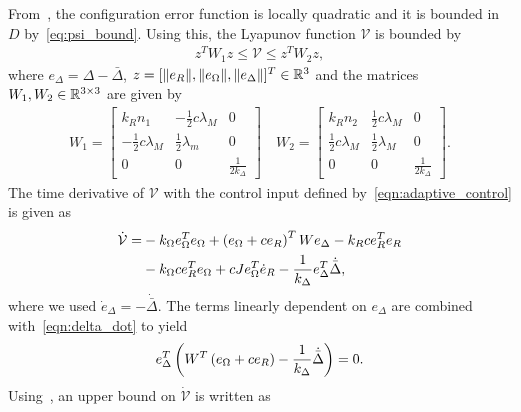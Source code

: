 From~, the configuration error function is locally quadratic and it is bounded in \( D \) by~\cref{eq:psi_bound}.
Using this, the Lyapunov function \( \mathcal{V} \) is bounded by
\begin{align*} %
	z^T W_1 z \leq \mathcal{V} \leq z^T W_2 z ,
\end{align*}
where \( e_\Delta = \Delta - \bar{\Delta} \), \( z = [\|e_R\|,\|e_\Omega\|,\|e_\Delta\|]^T\in\mathbb{R}^3 \) and the matrices \(W_1,W_2 \in \mathbb{R}^{3 \times 3}\) are given by
\begin{align*}
	W_1  = \begin{bmatrix}
		k_R n_1 & -\frac{1}{2} c \lambda_M & 0 \\
		-\frac{1}{2} c \lambda_M & \frac{1}{2} \lambda_m & 0 \\
		0 & 0 & \frac{1}{2 k_\Delta}
	\end{bmatrix}\quad
	W_2  = \begin{bmatrix}
		k_R n_2 & \frac{1}{2} c \lambda_M & 0 \\
		\frac{1}{2} c \lambda_M & \frac{1}{2} \lambda_M & 0 \\
		0 & 0 & \frac{1}{2 k_\Delta}
	\end{bmatrix}.
\end{align*}
The time derivative of \( \mathcal{V}\) with the control input defined by~\cref{eqn:adaptive_control} is given as
\begin{align*}
	\dot{\mathcal{V}} =& - k_\Omega e_\Omega^T e_\Omega + \left( e_\Omega + c e_R \right)^T W e_\Delta - k_R c e_R^T e_R \nonumber\\
	&- k_\Omega c e_R^T e_\Omega + c J e_\Omega^T \dot{e}_R - \frac{1}{k_\Delta} e_\Delta^T \dot{\bar{\Delta}} , \label{eqn:vdot}
\end{align*}
where we used \( \dot{e}_\Delta = - \dot{\bar{\Delta}} \).
The terms linearly dependent on \( e_\Delta\) are combined with~\cref{eqn:delta_dot} to yield
\begin{align*}
	 e_\Delta^T \left( W^T \left( e_\Omega + c e_R \right) - \frac{1}{k_\Delta} \dot{\bar{\Delta}} \right) = 0. 
\end{align*}
Using~, an upper bound on \( \dot{\mathcal{V}} \) is written as
